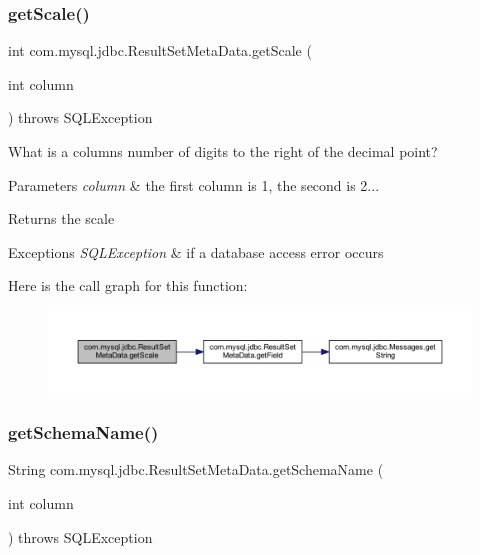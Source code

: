 \subsubsection{\texorpdfstring{get\+Scale()}{getScale()}}
{\footnotesize\ttfamily int com.\+mysql.\+jdbc.\+Result\+Set\+Meta\+Data.\+get\+Scale (\begin{DoxyParamCaption}\item[{int}]{column }\end{DoxyParamCaption}) throws S\+Q\+L\+Exception}

What is a column\textquotesingle{}s number of digits to the right of the decimal point?


\begin{DoxyParams}{Parameters}
{\em column} & the first column is 1, the second is 2...\\
\hline
\end{DoxyParams}
\begin{DoxyReturn}{Returns}
the scale
\end{DoxyReturn}

\begin{DoxyExceptions}{Exceptions}
{\em S\+Q\+L\+Exception} & if a database access error occurs \\
\hline
\end{DoxyExceptions}
Here is the call graph for this function\+:
\nopagebreak
\begin{figure}[H]
\begin{center}
\leavevmode
\includegraphics[width=350pt]{classcom_1_1mysql_1_1jdbc_1_1_result_set_meta_data_a758eaa931a2255393d83a424546c5b1b_cgraph}
\end{center}
\end{figure}
\mbox{\label{classcom_1_1mysql_1_1jdbc_1_1_result_set_meta_data_ad018cc38893e21611da91476268d5369}} 
\subsubsection{\texorpdfstring{get\+Schema\+Name()}{getSchemaName()}}
{\footnotesize\ttfamily String com.\+mysql.\+jdbc.\+Result\+Set\+Meta\+Data.\+get\+Schema\+Name (\begin{DoxyParamCaption}\item[{int}]{column }\end{DoxyParamCaption}) throws S\+Q\+L\+Exception}

